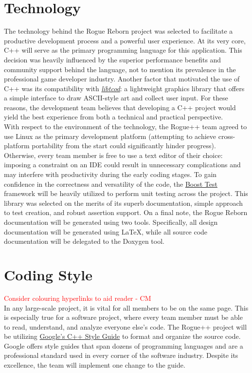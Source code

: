 \documentclass{article}
\begin{document}
\section{Technology}
\label{tech_label}

\indent
The technology behind the Rogue Reborn project was selected to facilitate a productive development process and a powerful user experience. At its very core, C++ will serve as the primary programming language for this application.  This decision was heavily influenced by the superior performance benefits and community support behind the language, not to mention its prevalence in the professional game developer industry.  Another factor that motivated the use of C++ was its compatibility with \href{http://roguecentral.org/doryen/libtcod/}{\textit{libtcod}}: a lightweight graphics library that offers a simple interface to draw ASCII-style art and collect user input.  For these reasons, the development team believes that developing a C++ project would yield the best experience from both a technical and practical perspective.\\

With respect to the environment of the technology, the Rogue++ team agreed to use Linux as the primary development platform (attempting to achieve cross-platform portability from the start could significantly hinder progress).  Otherwise, every team member is free to use a text editor of their choice: imposing a constraint on an IDE could result in unnecessary complications and may interfere with productivity during the early coding stages.  To gain confidence in the correctness and versatility of the code, the \href{http://www.boost.org/doc/libs/1_54_0/libs/test/doc/html/index.html}{Boost Test} framework will be heavily utilized to perform unit testing across the project.  This library was selected on the merits of its superb documentation, simple approach to test creation, and robust assertion support.  On a final note, the Rogue Reborn documentation will be generated using two tools.  Specifically, all design documentation will be generated using LaTeX, while all source code documentation will be delegated to the Doxygen tool.

\section{Coding Style}
\label{style_label}
\textcolor{red}{Consider colouring hyperlinks to aid reader - CM} \\
\indent
In any large-scale project, it is vital for all members to be on the same page.  This is especially true for a software project, where every team member must be able to read, understand, and analyze everyone else's code.  The Rogue++ project will be utilizing \href{https://google.github.io/styleguide/cppguide.html}{Google's C++ Style Guide} to format and organize the source code.  Google offers style guides that span dozens of programming languages and are a professional standard used in every corner of the software industry. Despite its excellence, the team will implement one change to the guide.\\
\end{document}

